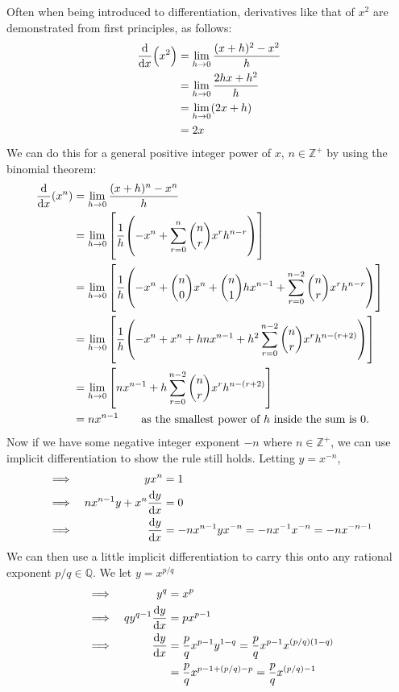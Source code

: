 \documentclass[fleqn,a4paper,11pt]{article}
\newcommand{\setstyle}{\mathbb}
\newcommand{\Integers}{\setstyle Z}
\newcommand{\Rationals}{\setstyle Q}
\begin{document}
    Often when being introduced to differentiation, derivatives like that of
    \(x^2\) are demonstrated from first principles, as follows:
    \begin{align*}
    \dv{x}(x^2) &= \lim_{h \to 0} \frac{(x + h)^2 - x^2} h \\
        &= \lim_{h \to 0} \frac{2hx + h^2} h \\
        &= \lim_{h \to 0} (2x + h) \\
        &= 2x
    \end{align*}
    We can do this for a general positive integer power of \(x\),
    \(n \in \Integers^+\) by using the binomial theorem:
    \begin{align*}
    \dv{x}(x^n) &= \lim_{h \to 0} \frac{(x + h)^n - x^n} h \\
        &= \lim_{h \to 0} \bqty{\frac 1h \pqty{-x^n
                              + \sum_{r = 0}^n \binom nr x^r h^{n - r}}} \\
        &= \lim_{h \to 0} \bqty{\frac 1h \pqty{
                                -x^n + \binom n0 x^n + \binom n1 hx^{n - 1}
                              + \sum_{r = 0}^{n - 2}
                                    \binom nr x^r h^{n - r}}} \\
        &= \lim_{h \to 0} \bqty{\frac 1h \pqty{-x^n + x^n + hnx^{n - 1}
                              + h^2 \sum_{r = 0}^{n - 2}
                                    \binom nr x^r h^{n - (r + 2)}}} \\
        &= \lim_{h \to 0} \bqty{nx^{n - 1} + h \sum_{r = 0}^{n - 2}
                                    \binom nr x^r h^{n - (r + 2)}} \\
        &= nx^{n-1} \qquad
            \text{as the smallest power of \(h\) inside the sum is 0.}
    \end{align*}
    Now if we have some negative integer exponent \(-n\) where
    \(n \in \Integers^+\), we can use implicit differentiation to show the rule
    still holds. Letting \(y = x^{-n}\),
    \begin{alignat*}{2}
    &\implies& yx^n &= 1 \\
    &\implies& nx^{n - 1}y + x^n \dv{y}{x} &= 0 \\
    &\implies& \dv{y}{x} &= -nx^{n - 1}yx^{-n}
        = -nx^{-1}x^{-n} = -nx^{-n - 1}
    \end{alignat*}
    We can then use a little implicit differentiation to carry this onto any
    rational exponent \(p / q \in \Rationals\). We let \(y = x^{p / q}\)
    \begin{alignat*}{2}
    &\implies& y^q &= x^p \\
    &\implies& qy^{q - 1}\dv{y}{x} &= px^{p - 1} \\
    &\implies& \dv{y}{x} &= \frac pq x^{p - 1}y^{1 - q}
        = \frac pq x^{p - 1}x^{(p / q)(1 - q)} \\
    &&  &= \frac pq x^{p - 1 + (p / q) - p}
        = \frac pq x^{(p / q) - 1}
    \end{alignat*}
\end{document}
